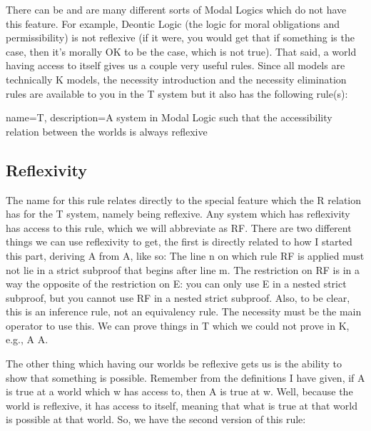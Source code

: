 There can be and are many different sorts of Modal Logics which do not have this feature. For example, Deontic Logic (the logic for moral obligations and permissibility) is not reflexive (if it were, you would get that if something is the case, then it's morally OK to be the case, which is not true). That said, a world having access to itself gives us a couple very useful rules. Since all models are technically K models, the necessity introduction and the necessity elimination rules are available to you in the T system but it also has the following rule(s):

{
name=T,
description={A system in Modal Logic such that the \gls{accessibility relation} between the \glspl{world} is always \gls{reflexive}}
}


\subsection{Reflexivity}

The name for this rule relates directly to the special feature which the R relation has for the T system, namely being reflexive. Any system which has reflexivity has access to this rule, which we will abbreviate as RF. There are two different things we can use reflexivity to get, the first is directly related to how I started this part, deriving A from \ebox A, like so:
The line n on which rule RF is applied must not lie in a strict subproof that begins after line m. The restriction on RF is in a way the opposite of the restriction on \ebox E: you can only use \ebox E in a nested strict subproof, but you cannot use RF in a nested strict subproof. Also, to be clear, this is an inference rule, not an equivalency rule. The necessity must be the main operator to use this. We can prove things in T which we could not prove in K, e.g., \ebox A \eif  A.
\begin{fitchproof}
\open
{}	
\close
{} 
\end{fitchproof}

The other thing which having our worlds be reflexive gets us is the ability to show that something is possible. Remember from the definitions I have given, if A is true at a world which w has access to, then \ediamond A is true at w. Well, because the world is reflexive, it has access to itself, meaning that what is true at that world is possible at that world. So, we have the second version of this rule:

